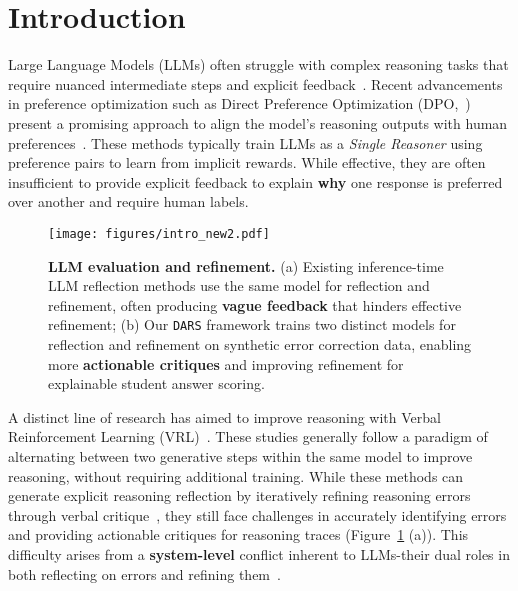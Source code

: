 








 












\section{Introduction}
Large Language Models (LLMs) %
often struggle with complex reasoning tasks that require nuanced intermediate steps and explicit feedback~\cite{li_emnlp2023}.
Recent advancements in preference optimization such as Direct Preference Optimization (DPO,~\citealt{dpo}) present a promising approach to align the model’s reasoning outputs with human preferences~\cite{pang2024iterativereasoningpreferenceoptimization,step_dpo}.
These methods typically train LLMs as a \emph{Single Reasoner} using preference pairs to learn from implicit rewards. %
While effective, they are often insufficient to provide explicit feedback to explain \textbf{why} one response is preferred over another \cite{dpo_drawback,sampo,chowdhury2024provably} and require human labels.


\begin{figure}[t]
\centering
\texttt{[image: figures/intro\_new2.pdf]}
\vspace{-2mm}
\caption{\textbf{LLM evaluation and refinement.} (a) Existing inference-time LLM reflection methods use the same model for reflection and refinement, often producing \textbf{vague feedback} that hinders effective refinement; %
(b) Our \texttt{DARS} framework trains two distinct models for reflection and refinement on synthetic error correction data, enabling more \textbf{actionable critiques} and improving refinement for explainable student answer scoring.} %
\label{fig:intro}
\vspace{-6mm}
\end{figure}
A distinct line of research has aimed to improve reasoning with Verbal Reinforcement Learning (VRL)~\cite{shinn2023reflexion, Kumar2024TrainingLM, Snell2024ScalingLT}.
These studies generally follow a paradigm of alternating between two generative steps within the same model to improve reasoning, without requiring additional training.
While these methods can generate explicit reasoning reflection by iteratively refining reasoning errors through verbal critique~\cite{wei-jie-etal-2024-interpretable}, they still face challenges in accurately identifying errors and providing actionable critiques for reasoning traces \cite{kamoi-etal-2024-llms} (Figure~\ref{fig:intro} (a)). This difficulty arises from a \textbf{system-level} conflict inherent to LLMs-their dual roles in both reflecting on errors and refining them~\cite{Huang2023LargeLM}.



